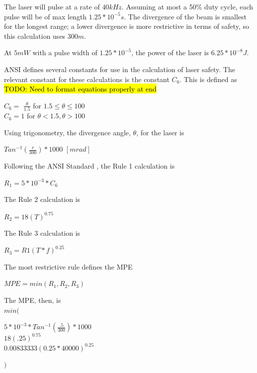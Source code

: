 \documentclass[letterpaper,10pt]{article}
\begin{document}
\begin{spacing}{1.15}
 The laser will pulse at a rate of $40 kHz$. Assuming at most a 50\% duty cycle, each pulse will be of max length $1.25*10^{-5} s$. The divergence of the beam is smallest for the longest range; a lower divergence is more restrictive in terms of safety, so this calculation uses $300m$. 
 
 At $5mW$ with a pulse width of $1.25*10^{-5}$, the power of the laser is $6.25*10^{-8} J$. 
 
 ANSI defines several constants for use in the calculation of laser safety. The relevant constant for these calculations is the constant $C_6$. This is defined as \hl{TODO: Need to format equations properly at end}
 \begin{center}
 	\large
 	$C_6 =$
 	$\frac{\theta}{1.5}$ for $1.5 \leq \theta \leq 100$\\
 	$C_6 = 1$ for $\theta < 1.5, \theta > 100$
 \end{center}
 
 Using trigonometry, the divergence angle, $\theta$, for the laser is 
 \begin{center}
 	\large
 	$Tan^{-1}(\frac{r}{300})* 1000$ $[mrad]$
 \end{center}
 
 Following the ANSI Standard \cite{ANSI}, the Rule 1 calculation is 
 \begin{center}
 	\large
 	$R_1 = 5*10^{-3} * C_6$
 \end{center}
 
 The Rule 2 calculation is
 \begin{center}
 	\large
 	$R_2 = 18 (T)^{0.75}$
 \end{center}
 
 The Rule 3 calculation is
 \begin{center}
 	\large
 	$R_3 = R1(T*f)^{0.25}$
 \end{center}
 
 The most restrictive rule defines the MPE 
 \begin{center}
 	\large
 	$MPE = min(R_1, R_2, R_3)$
 \end{center}
 
 The MPE, then, is\\
 {\large $min($}
 \begin{center}
 	\large
 	$ 5*10^{-3} * Tan^{-1}(\frac{.5}{300})* 1000$\\
 	$18 (.25)^{0.75}$ \\
 	$0.00833333 (0.25*40000)^{0.25}$
 \end{center}
 {\large $)$}
 

\end{spacing}
\end{document}
